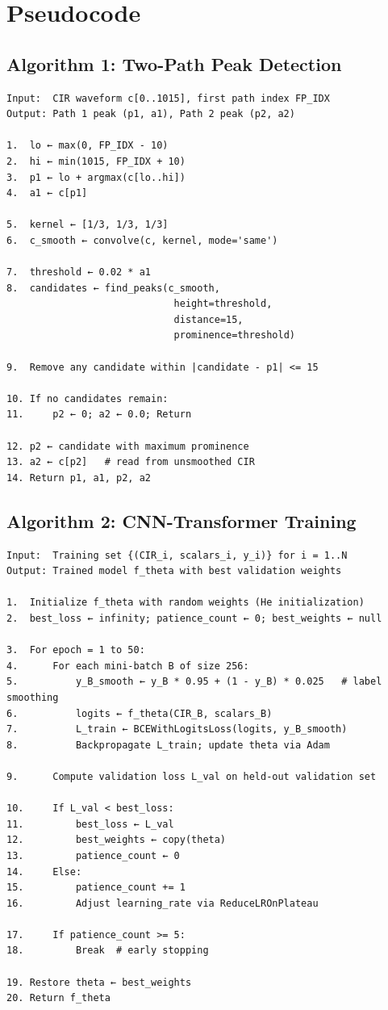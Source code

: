 \documentclass[12pt,a4paper]{article}
\begin{document}
\section{Pseudocode}\label{pseudocode}

\subsection{Algorithm 1: Two-Path Peak
Detection}\label{algorithm-1-two-path-peak-detection}

\begin{lstlisting}
Input:  CIR waveform c[0..1015], first path index FP_IDX
Output: Path 1 peak (p1, a1), Path 2 peak (p2, a2)

1.  lo ← max(0, FP_IDX - 10)
2.  hi ← min(1015, FP_IDX + 10)
3.  p1 ← lo + argmax(c[lo..hi])
4.  a1 ← c[p1]

5.  kernel ← [1/3, 1/3, 1/3]
6.  c_smooth ← convolve(c, kernel, mode='same')

7.  threshold ← 0.02 * a1
8.  candidates ← find_peaks(c_smooth,
                             height=threshold,
                             distance=15,
                             prominence=threshold)

9.  Remove any candidate within |candidate - p1| <= 15

10. If no candidates remain:
11.     p2 ← 0; a2 ← 0.0; Return

12. p2 ← candidate with maximum prominence
13. a2 ← c[p2]   # read from unsmoothed CIR
14. Return p1, a1, p2, a2
\end{lstlisting}

\subsection{Algorithm 2: CNN-Transformer
Training}\label{algorithm-2-cnn-transformer-training}

\begin{lstlisting}
Input:  Training set {(CIR_i, scalars_i, y_i)} for i = 1..N
Output: Trained model f_theta with best validation weights

1.  Initialize f_theta with random weights (He initialization)
2.  best_loss ← infinity; patience_count ← 0; best_weights ← null

3.  For epoch = 1 to 50:
4.      For each mini-batch B of size 256:
5.          y_B_smooth ← y_B * 0.95 + (1 - y_B) * 0.025   # label smoothing
6.          logits ← f_theta(CIR_B, scalars_B)
7.          L_train ← BCEWithLogitsLoss(logits, y_B_smooth)
8.          Backpropagate L_train; update theta via Adam

9.      Compute validation loss L_val on held-out validation set

10.     If L_val < best_loss:
11.         best_loss ← L_val
12.         best_weights ← copy(theta)
13.         patience_count ← 0
14.     Else:
15.         patience_count += 1
16.         Adjust learning_rate via ReduceLROnPlateau

17.     If patience_count >= 5:
18.         Break  # early stopping

19. Restore theta ← best_weights
20. Return f_theta
\end{lstlisting}
\end{document}
